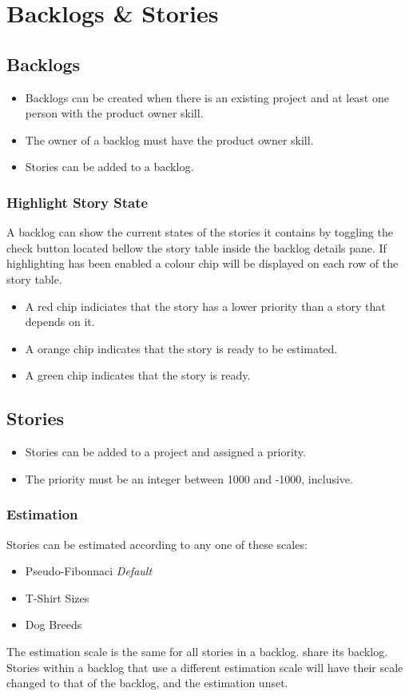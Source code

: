 \documentclass[11pt,fleqn]{book} %
\begin{document}
\section{Backlogs \& Stories}

\subsection{Backlogs}

\begin{itemize}
\item Backlogs can be created when there is an existing project and at least one person with the product owner skill.
\item The owner of a backlog must have the product owner skill. 
\item Stories can be added to a backlog.
\end{itemize}

\subsubsection{Highlight Story State}
A backlog can show the current states of the stories it contains by toggling the check button located bellow the story table inside the backlog details pane.
If highlighting has been enabled a colour chip will be displayed on each row of the story table.
\begin{itemize}
\item A red chip indiciates that the story has a lower priority than a story that depends on it.
\item A orange chip indicates that the story is ready to be estimated.
\item A green chip indicates that the story is ready.
\end{itemize}


\subsection{Stories}

\begin{itemize}
  \item Stories can be added to a project and assigned a priority.
  \item The priority must be an integer between 1000 and -1000, inclusive.
\end{itemize}

\subsubsection{Estimation}
Stories can be estimated according to any one of these scales:
\begin{itemize}
\item Pseudo-Fibonnaci \textit{Default}
\item T-Shirt Sizes
\item Dog Breeds
\end{itemize}
The estimation scale is the same for all stories in a backlog.
share its backlog. Stories within a backlog that use a different estimation
scale will have their scale changed to that of the backlog, and the estimation unset.
\end{document}
